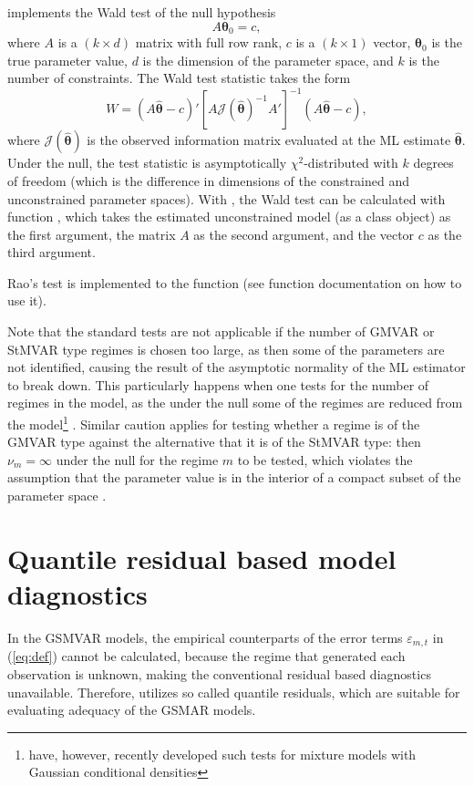 \documentclass[nojss]{jss}
\begin{document}
 implements the Wald test of the null hypothesis
\begin{equation}
A\boldsymbol{\theta}_0 = c,
\end{equation}
where $A$ is a $(k \times d)$ matrix with full row rank, $c$ is a $(k \times 1)$ vector, $\boldsymbol{\theta}_0$ is the true parameter value, $d$ is the dimension of the parameter space, and $k$ is the number of constraints. The Wald test statistic takes the form
\begin{equation}
W = (A\hat{\boldsymbol{\theta}} - c)' [A\mathcal{J}(\hat{\boldsymbol{\theta}})^{-1}A']^{-1}(A\hat{\boldsymbol{\theta}} - c),
\end{equation}
where $\mathcal{J}(\hat{\boldsymbol{\theta}})$ is the observed information matrix evaluated at the ML estimate $\hat{\boldsymbol{\theta}}$. Under the null, the test statistic is asymptotically $\chi^2$-distributed with $k$ degrees of freedom (which is the difference in dimensions of the constrained and unconstrained parameter spaces). With , the Wald test can be calculated with function , which takes the estimated unconstrained model (as a class  object) as the first argument, the matrix $A$ as the second argument, and the vector $c$ as the third argument.

Rao's test is implemented to the function  (see function documentation on how to use it).

Note that the standard tests are not applicable if the number of GMVAR or StMVAR type regimes is chosen too large, as then some of the parameters are not identified, causing the result of the asymptotic normality of the ML estimator to break down. This particularly happens when one tests for the number of regimes in the model, as the under the null some of the regimes are reduced from the model\footnote{\cite{Meitz+Saikkonen:2021} have, however, recently developed such tests for mixture models with Gaussian conditional densities} \citep[see the related discussion in][]{Virolainen2:2021}. Similar caution applies for testing whether a regime is of the GMVAR type against the alternative that it is of the StMVAR type: then $\nu_m = \infty$ under the null for the regime $m$ to be tested, which violates the assumption that the parameter value is in the interior of a compact subset of the parameter space \citep[see][Theorem 3 and Assumption 1]{Virolainen2:2021}.


\section{Quantile residual based model diagnostics}\label{sec:qres}
In the GSMVAR models, the empirical counterparts of the error terms $\varepsilon_{m,t}$ in (\ref{eq:def}) cannot be calculated, because the regime that generated each observation is unknown, making the conventional residual based diagnostics unavailable. Therefore,  utilizes so called quantile residuals, which are suitable for evaluating adequacy of the GSMAR models.
\end{document}
